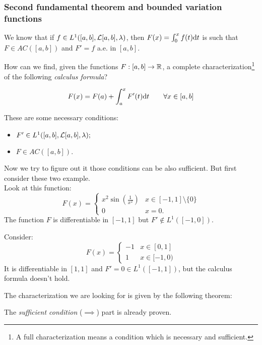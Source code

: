 \subsubsection{Second fundamental theorem and bounded variation functions}

We know that if $f\in L^1([a,b], \mathcal L[a,b], \lambda)$, then $F(x)=\int_0^x f(t) \mathrm d t$ is such that $F\in AC([a,b])$ and $F'=f$ a.e. in $[a,b]$.

How can we find, given the functions $F:[a,b]\to \mathbb R$, a complete characterization\footnote{A full characterization means a condition which is necessary and sufficient.} of the following \emph{calculus formula}?

$$F(x)=F(a)+\int_a^x F'(t) \mathrm d t \qquad \forall x\in [a,b]$$

These are some necessary conditions:
\begin{itemize}
	\item $F' \in L^1([a,b],\mathcal L[a,b],\lambda);$
	\item $F \in AC([a,b]).$
\end{itemize}
Now we try to figure out it those conditions can be also sufficient. But first consider these two example.\\
Look at this function: $$F(x)=\begin{cases}
x^2 \sin(\frac{1}{x^2}) &x\in[-1,1] \setminus \{0\}\\
0 &x=0.
\end{cases}$$
The function $F$ is differentiable in $[-1,1]$ but $F'\notin L^1([-1,0])$.

Consider: $$F(x) = \begin{cases}
-1 &x\in [0,1]\\
1&x\in[-1,0)
\end{cases}$$
It is differentiable in $[1,1]$ and $F'=0 \in L^1([-1,1])$, but the calculus formula doesn't hold.

The characterization we are looking for is given by the following theorem:
The \textit{sufficient condition} ($\implies$) part is already proven. 


